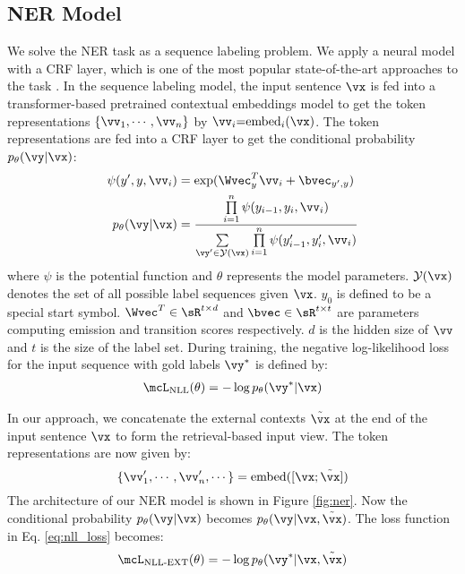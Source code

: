 \subsection{NER Model}
We solve the NER task as a sequence labeling problem. We apply a neural model with a CRF layer, which is one of the most popular state-of-the-art approaches to the task \citep{lample-etal-2016-neural,ma-hovy-2016-end,akbik-etal-2019-pooled}. In the sequence labeling model, the input sentence $\vx$ is fed into a transformer-based pretrained contextual embeddings model to get the token representations $\{\vv_1, \cdots, \vv_n\}$ by $\vv_i {=} \text{embed}_i (\vx)$.
The token representations are fed into a CRF layer to get the conditional probability $p_\theta(\vy|\vx)$:
\begin{align}
    \psi(y', y, \vv_i) &= \exp(\Wvec_{y}^{T} \vv_i + \bvec_{y',y}) \label{eq:psi}\\
    p_\theta(\vy|\vx) &= \frac{\prod\limits_{i=1}^{n} \psi(y_{i-1}, y_i, \vv_i)}{\sum\limits_{\vy' \in \mathcal{Y}(\vx)} \prod\limits_{i=1}^{n} \psi(y'_{i-1}, y'_i, \vv_i)}\nonumber
\end{align}
where $\psi$ is the potential function and $\theta$ represents the model parameters. $\mathcal{Y}(\vx)$ denotes the set of all possible label sequences given $\vx$. $y_0$ is defined to be a special start symbol. $\Wvec^{T}\in \sR^{t\times d}$ and $\bvec \in \sR^{t \times t}$ are parameters computing emission and transition scores respectively. $d$ is the hidden size of $\vv$ and $t$ is the size of the label set. During training, the negative log-likelihood loss for the input sequence with gold labels $\vy^*$ is defined by:
\begin{align}
\mcL_{\text{NLL}}(\theta) = - \log p_\theta(\vy^*|\vx) \label{eq:nll_loss}
\end{align}

In our approach, we concatenate the external contexts $\tilde{\vx}$ at the end of the input sentence $\vx$ to form the retrieval-based input view. %
The token representations are now given by:
\begin{displaymath}
\{\vv_1^{\prime},\cdots,\vv^{\prime}_n,\cdots\} = \text{embed} ([\vx;\tilde{\vx}])
\end{displaymath}
The architecture of our NER model is shown in Figure \ref{fig:ner}. Now the conditional probability $p_\theta(\vy|\vx)$ becomes $p_\theta(\vy|\vx, \tilde{\vx})$. 
The loss function in Eq. \ref{eq:nll_loss} becomes:
\begin{align}
\mcL_{\text{NLL-EXT}}(\theta) = - \log p_\theta(\vy^*|\vx,\tilde{\vx}) \label{eq:nll_loss_x}
\end{align}

